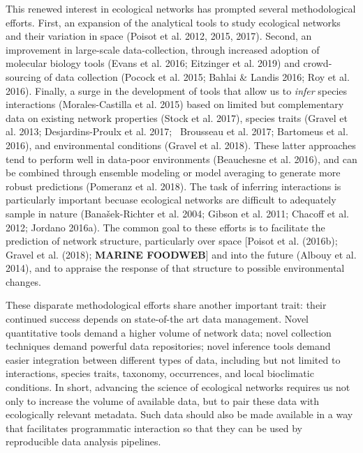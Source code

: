 This renewed interest in ecological networks has prompted several
methodological efforts. First, an expansion of the analytical tools to
study ecological networks and their variation in space (Poisot et al.
2012, 2015, 2017). Second, an improvement in large-scale
data-collection, through increased adoption of molecular biology tools
(Evans et al. 2016; Eitzinger et al. 2019) and crowd-sourcing of data
collection (Pocock et al. 2015; Bahlai \& Landis 2016; Roy et al. 2016).
Finally, a surge in the development of tools that allow us to
\emph{infer} species interactions (Morales-Castilla et al. 2015) based
on limited but complementary data on existing network properties (Stock
et al. 2017), species traits (Gravel et al. 2013; Desjardins-Proulx et
al. 2017; ~Brousseau et al. 2017; Bartomeus et al. 2016), and
environmental conditions (Gravel et al. 2018). These latter approaches
tend to perform well in data-poor environments (Beauchesne et al. 2016),
and can be combined through ensemble modeling or model averaging to
generate more robust predictions (Pomeranz et al. 2018). The task of
inferring interactions is particularly important becuase ecological
networks are difficult to adequately sample in nature (Banašek-Richter
et al. 2004; Gibson et al. 2011; Chacoff et al. 2012; Jordano 2016a).
The common goal to these efforts is to facilitate the prediction of
network structure, particularly over space {[}Poisot et al. (2016b);
Gravel et al. (2018); \textbf{MARINE FOODWEB}{]} and into the future
(Albouy et al. 2014), and to appraise the response of that structure to
possible environmental changes.

These disparate methodological efforts share another important trait:
their continued success depends on state-of-the art data management.
Novel quantitative tools demand a higher volume of network data; novel
collection techniques demand powerful data repositories; novel inference
tools demand easier integration between different types of data,
including but not limited to interactions, species traits, taxonomy,
occurrences, and local bioclimatic conditions. In short, advancing the
science of ecological networks requires us not only to increase the
volume of available data, but to pair these data with ecologically
relevant metadata. Such data should also be made available in a way that
facilitates programmatic interaction so that they can be used by
reproducible data analysis pipelines.

